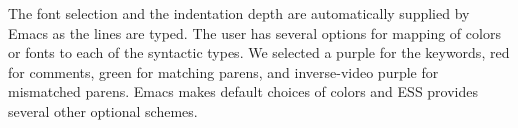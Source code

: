 \documentclass{article}
\newif\ifdraft
\newcommand{\stexttt}[1]{{\small\texttt{#1}}}
\newcommand{\emptyfig}{
\hspace*{42pt}\rule{324pt}{.25pt}\\
\hspace*{42pt}\rule{.25pt}{10pc}
\rule{316pt}{.25pt}
\rule{.25pt}{10pc}}
\begin{document}

The font selection and the indentation depth are automatically
supplied by Emacs as the lines are typed.  The user has several
options for mapping of colors or fonts to each of the syntactic types.
We selected a 
purple for the keywords, red for comments, green
for matching parens, and inverse-video purple for mismatched parens.
Emacs makes default choices of colors and ESS
provides several other optional schemes.




\end{document}
